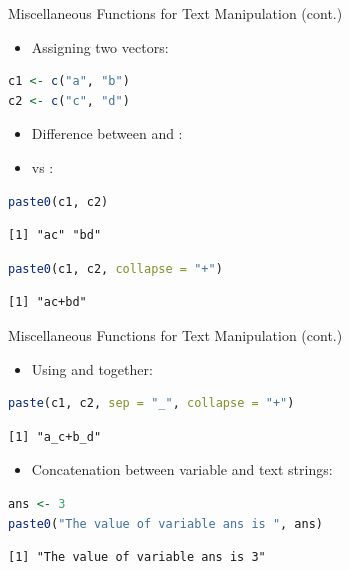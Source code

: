 \begin{frame}[fragile]{Miscellaneous Functions for Text Manipulation (cont.)}
\begin{itemize}
  \item Assigning two vectors:
\end{itemize}
\begin{lstlisting}[language=R]
c1 <- c("a", "b")
c2 <- c("c", "d")
\end{lstlisting}
\begin{itemize}
  \item Difference between  and :
  \item {} vs :
\end{itemize}
\begin{lstlisting}[language=R]
paste0(c1, c2)
\end{lstlisting}
\begin{lstlisting}[style=output]
[1] "ac" "bd"
\end{lstlisting}
\begin{lstlisting}[language=R]
paste0(c1, c2, collapse = "+")
\end{lstlisting}
\begin{lstlisting}[style=output]
[1] "ac+bd"
\end{lstlisting}
\end{frame}

\begin{frame}[fragile]{Miscellaneous Functions for Text Manipulation (cont.)}
\begin{itemize}
  \item Using  and  together:
\end{itemize}
\begin{lstlisting}[language=R]
paste(c1, c2, sep = "_", collapse = "+")
\end{lstlisting}
\begin{lstlisting}[style=output]
[1] "a_c+b_d"
\end{lstlisting}
\begin{itemize}
  \item Concatenation between variable and text strings:
\end{itemize}
\begin{lstlisting}[language=R]
ans <- 3
paste0("The value of variable ans is ", ans)
\end{lstlisting}
\begin{lstlisting}[style=output]
[1] "The value of variable ans is 3"
\end{lstlisting}
\end{frame}


